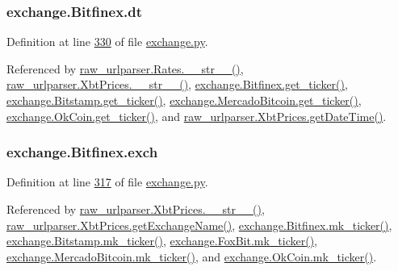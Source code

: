 \subsubsection[{\texorpdfstring{dt}{dt}}]{\setlength{\rightskip}{0pt plus 5cm}exchange.\+Bitfinex.\+dt}\hypertarget{classexchange_1_1_bitfinex_adc9e5a19056dcc22e8028e749b233795}{}\label{classexchange_1_1_bitfinex_adc9e5a19056dcc22e8028e749b233795}


Definition at line \hyperlink{exchange_8py_source_l00330}{330} of file \hyperlink{exchange_8py_source}{exchange.\+py}.



Referenced by \hyperlink{raw__urlparser_8py_source_l00038}{raw\+\_\+urlparser.\+Rates.\+\_\+\+\_\+str\+\_\+\+\_\+()}, \hyperlink{raw__urlparser_8py_source_l00074}{raw\+\_\+urlparser.\+Xbt\+Prices.\+\_\+\+\_\+str\+\_\+\+\_\+()}, \hyperlink{exchange_8py_source_l00332}{exchange.\+Bitfinex.\+get\+\_\+ticker()}, \hyperlink{exchange_8py_source_l00401}{exchange.\+Bitstamp.\+get\+\_\+ticker()}, \hyperlink{exchange_8py_source_l00535}{exchange.\+Mercado\+Bitcoin.\+get\+\_\+ticker()}, \hyperlink{exchange_8py_source_l00600}{exchange.\+Ok\+Coin.\+get\+\_\+ticker()}, and \hyperlink{raw__urlparser_8py_source_l00059}{raw\+\_\+urlparser.\+Xbt\+Prices.\+get\+Date\+Time()}.

\subsubsection[{\texorpdfstring{exch}{exch}}]{\setlength{\rightskip}{0pt plus 5cm}exchange.\+Bitfinex.\+exch}\hypertarget{classexchange_1_1_bitfinex_af5865e2fa72ee1706254ba963bfa10e9}{}\label{classexchange_1_1_bitfinex_af5865e2fa72ee1706254ba963bfa10e9}


Definition at line \hyperlink{exchange_8py_source_l00317}{317} of file \hyperlink{exchange_8py_source}{exchange.\+py}.



Referenced by \hyperlink{raw__urlparser_8py_source_l00074}{raw\+\_\+urlparser.\+Xbt\+Prices.\+\_\+\+\_\+str\+\_\+\+\_\+()}, \hyperlink{raw__urlparser_8py_source_l00068}{raw\+\_\+urlparser.\+Xbt\+Prices.\+get\+Exchange\+Name()}, \hyperlink{exchange_8py_source_l00346}{exchange.\+Bitfinex.\+mk\+\_\+ticker()}, \hyperlink{exchange_8py_source_l00415}{exchange.\+Bitstamp.\+mk\+\_\+ticker()}, \hyperlink{exchange_8py_source_l00474}{exchange.\+Fox\+Bit.\+mk\+\_\+ticker()}, \hyperlink{exchange_8py_source_l00549}{exchange.\+Mercado\+Bitcoin.\+mk\+\_\+ticker()}, and \hyperlink{exchange_8py_source_l00614}{exchange.\+Ok\+Coin.\+mk\+\_\+ticker()}.

